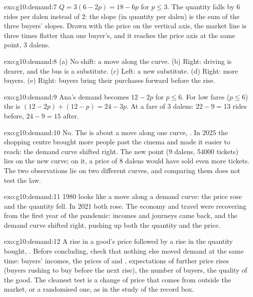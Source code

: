 \begin{solution}{exo:g10:demand:7}
$Q = 3(6 - 2p) = 18 - 6p$ for $p \le 3$. The quantity falls by 6 rides per dalen instead of 2: the slope (in quantity per
dalen) is the sum of the three buyers' slopes. Drawn with the price on the vertical axis, the market line is three times
flatter than one buyer's, and it reaches the price axis at the same point, 3 dalens.
\end{solution}

\begin{solution}{exo:g10:demand:8}
(a) No shift: a move along the curve. (b) Right: driving is dearer, and the bus is a substitute. (c) Left: a new substitute.
(d) Right: more buyers. (e) Right: buyers bring their purchases forward before the rise.
\end{solution}

\begin{solution}{exo:g10:demand:9}
Ana's demand becomes $12 - 2p$ for $p \le 6$. For low fares ($p \le 6$) the  is $(12 - 2p) + (12 - p) = 24 - 3p$. At a
fare of 3 dalens: $22 - 9 = 13$ rides before, $24 - 9 = 15$ after.
\end{solution}

\begin{solution}{exo:g10:demand:10}
No. The  is about a move along one curve, . In 2025 the shopping centre brought more people
past the cinema and made it easier to reach: the demand curve shifted right. The new point (9 dalens, \num{54000} tickets) lies
on the new curve; on it, a price of 8 dalens would have sold even more tickets. The two observations lie on two different
curves, and comparing them does not test the law.
\end{solution}

\begin{solution}{exo:g10:demand:11}
1980 looks like a move along a demand curve: the price rose and the quantity fell. In 2021 both rose. The economy and travel were
recovering from the first year of the pandemic: incomes and journeys came back, and the demand curve shifted right, pushing up
both the quantity and the price.
\end{solution}

\begin{solution}{exo:g10:demand:12}
A rise in a good's price followed by a rise in the quantity bought, \emph{}. Before concluding, check that
nothing else moved demand at the same time: buyers' incomes, the prices of  and , expectations of further
price rises (buyers rushing to buy before the next rise), the number of buyers, the quality of the good. The cleanest test is a
change of price that comes from outside the market, or a randomised one, as in the study of the record box.
\end{solution}

